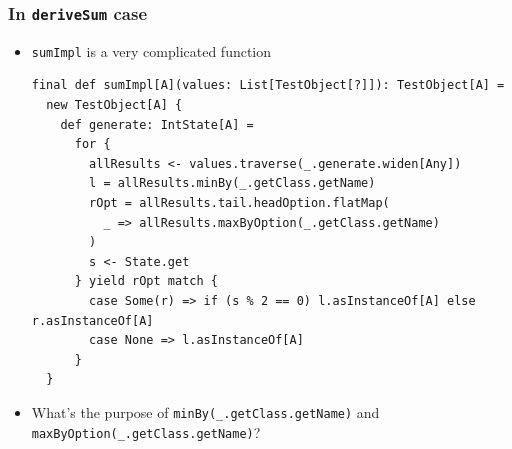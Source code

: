 \begin{frame}[fragile]
  \frametitle{ In \lstinline|deriveSum| case}

  \begin{itemize}
    \item<+-> \lstinline|sumImpl| is a very complicated function
\begin{lstlisting}[style=scala]
final def sumImpl[A](values: List[TestObject[?]]): TestObject[A] =
  new TestObject[A] {
    def generate: IntState[A] =
      for {
        allResults <- values.traverse(_.generate.widen[Any])
        l = allResults.minBy(_.getClass.getName)
        rOpt = allResults.tail.headOption.flatMap(
          _ => allResults.maxByOption(_.getClass.getName)
        )
        s <- State.get
      } yield rOpt match {
        case Some(r) => if (s % 2 == 0) l.asInstanceOf[A] else r.asInstanceOf[A]
        case None => l.asInstanceOf[A]
      }
  }
\end{lstlisting}

    \item<+-> What's the purpose of \lstinline|minBy(_.getClass.getName)| and \lstinline|maxByOption(_.getClass.getName)|?
  \end{itemize}

\end{frame}

